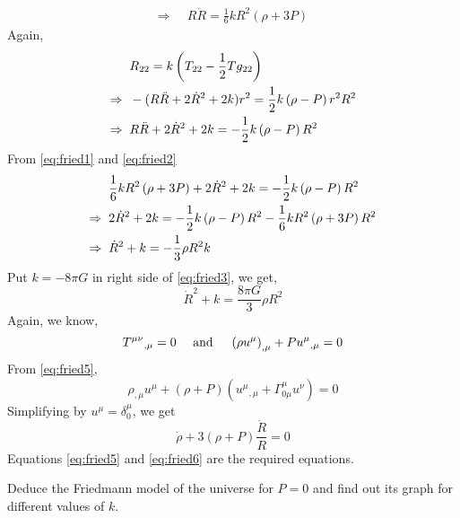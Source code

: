 \documentclass[../main-sheet.tex]{subfiles}
\begin{document}
\begin{soln}
\begin{align}
        \Rightarrow\;\;& R\ddot{R}=\frac{1}{6}kR^2 \left( \rho+3P \right)\label{eq:fried1}
    \end{align}
    Again,
    \begin{align}
        & R_{22}=k\left( T_{22}-\frac{1}{2}T g_{22}  \right)\notag\\
        \Rightarrow\;\;& -(R\ddot{R}+2\dot{R}^2+2k)r^2=\frac{1}{2}k\left( \rho-P \right)r^2R^2\notag\\
        \Rightarrow\;\;& R\ddot{R}+2\dot{R}^2+2k=-\frac{1}{2}k\left( \rho-P \right)R^2\label{eq:fried2}
    \end{align}
    From \eqref{eq:fried1} and \eqref{eq:fried2}
    \begin{align}
        & \frac{1}{6}kR^2 \left( \rho+3P \right)+2\dot{R}^2+2k=-\frac{1}{2}k\left( \rho-P \right)R^2\notag\\
        \Rightarrow\;\;& 2\dot{R}^2+2k=-\frac{1}{2}k\left( \rho-P \right)R^2-\frac{1}{6}kR^2 \left( \rho+3P \right)R^2\notag\\
        \Rightarrow\;\;& \dot{R}^2+k=-\frac{1}{3}\rho R^2k\label{eq:fried3}
    \end{align}
    Put \(k=-8\pi G \) in right side of \eqref{eq:fried3}, we get,
    \begin{equation}
        \dot{R}^2+k=\frac{8\pi G}{3}\rho R^2
        \label{eq:fried4}
    \end{equation}
    Again, we know,
    \begin{equation}
        {T^{\mu\nu}}_{,\mu}=0\quad \text{ and }\quad \left( \rho u^\mu \right)_{,\mu}+P {u^\mu}_{,\mu}=0 \label{eq:fried5}
    \end{equation}
    From \eqref{eq:fried5},
    \[
        \rho_{,\mu}u^\mu+(\rho+P)\left( {u^\mu}_{,\mu}+\Gamma_{0\mu}^\mu u^\nu \right)=0\]
        Simplifying by \(u^\mu=\delta_0^\mu\), we get
    \begin{equation}
        \dot{\rho}+3(\rho+P)\frac{\dot{R}}{R }=0 \label{eq:fried6}
    \end{equation}
    Equations \eqref{eq:fried5} and \eqref{eq:fried6} are the required equations.
\end{soln}
\begin{prob}
    Deduce the Friedmann model of the universe for \(P=0 \) and find out its graph for different values of \(k \).
\end{prob}
\end{document}
